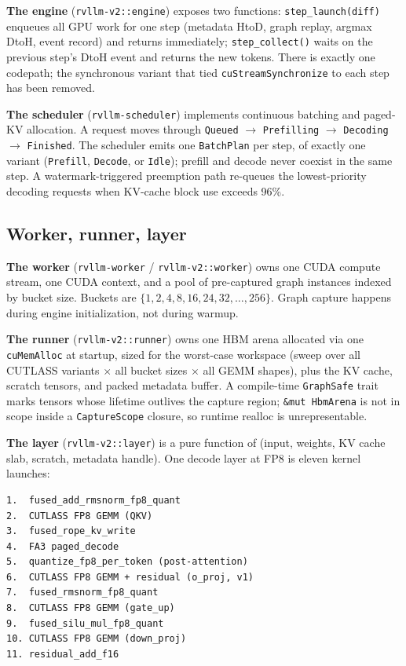 \textbf{The engine} (\texttt{rvllm-v2::engine}) exposes two functions:
\texttt{step\_launch(diff)} enqueues all GPU work for one step (metadata
HtoD, graph replay, argmax DtoH, event record) and returns immediately;
\texttt{step\_collect()} waits on the previous step's DtoH event and
returns the new tokens. There is exactly one codepath; the synchronous
variant that tied \texttt{cuStreamSynchronize} to each step has been
removed.

\textbf{The scheduler} (\texttt{rvllm-scheduler}) implements continuous
batching and paged-KV allocation. A request moves through
\texttt{Queued} $\to$ \texttt{Prefilling} $\to$ \texttt{Decoding} $\to$
\texttt{Finished}. The scheduler emits one \texttt{BatchPlan} per step,
of exactly one variant (\texttt{Prefill}, \texttt{Decode}, or
\texttt{Idle}); prefill and decode never coexist in the same step. A
watermark-triggered preemption path re-queues the lowest-priority
decoding requests when KV-cache block use exceeds 96\%.

\subsection{Worker, runner, layer}

\textbf{The worker} (\texttt{rvllm-worker} / \texttt{rvllm-v2::worker})
owns one CUDA compute stream, one CUDA context, and a pool of pre-captured
graph instances indexed by bucket size. Buckets are
$\{1,2,4,8,16,24,32,\ldots,256\}$. Graph capture happens during engine
initialization, not during warmup.

\textbf{The runner} (\texttt{rvllm-v2::runner}) owns one HBM arena
allocated via one \texttt{cuMemAlloc} at startup, sized for the
worst-case workspace (sweep over all CUTLASS variants $\times$ all
bucket sizes $\times$ all GEMM shapes), plus the KV cache, scratch
tensors, and packed metadata buffer. A compile-time \texttt{GraphSafe}
trait marks tensors whose lifetime outlives the capture region;
\texttt{\&mut HbmArena} is not in scope inside a \texttt{CaptureScope}
closure, so runtime realloc is unrepresentable.

\textbf{The layer} (\texttt{rvllm-v2::layer}) is a pure function of
(input, weights, KV cache slab, scratch, metadata handle). One decode
layer at FP8 is eleven kernel launches:

\begin{verbatim}
1.  fused_add_rmsnorm_fp8_quant
2.  CUTLASS FP8 GEMM (QKV)
3.  fused_rope_kv_write
4.  FA3 paged_decode
5.  quantize_fp8_per_token (post-attention)
6.  CUTLASS FP8 GEMM + residual (o_proj, v1)
7.  fused_rmsnorm_fp8_quant
8.  CUTLASS FP8 GEMM (gate_up)
9.  fused_silu_mul_fp8_quant
10. CUTLASS FP8 GEMM (down_proj)
11. residual_add_f16
\end{verbatim}

